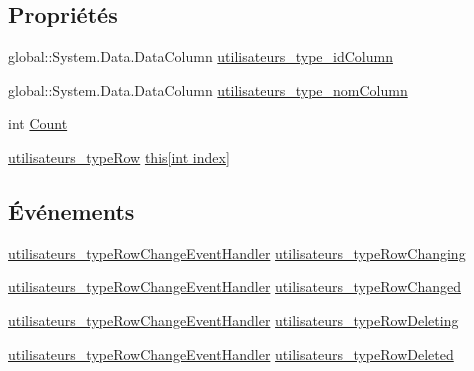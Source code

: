 \subsection*{Propriétés}
\begin{DoxyCompactItemize}
\item 
global\+::\+System.\+Data.\+Data\+Column \hyperlink{classforma_1_1formadb_data_set_1_1utilisateurs__type_data_table_a380f598143cd7d3549799af7fa6fd5eb}{utilisateurs\+\_\+type\+\_\+id\+Column}
\item 
global\+::\+System.\+Data.\+Data\+Column \hyperlink{classforma_1_1formadb_data_set_1_1utilisateurs__type_data_table_a3016a5d31607bd898c35f7227cc04d40}{utilisateurs\+\_\+type\+\_\+nom\+Column}
\item 
int \hyperlink{classforma_1_1formadb_data_set_1_1utilisateurs__type_data_table_a61fe8f0225f3e2f59c0801a73834f76d}{Count}
\item 
\hyperlink{classforma_1_1formadb_data_set_1_1utilisateurs__type_row}{utilisateurs\+\_\+type\+Row} \hyperlink{classforma_1_1formadb_data_set_1_1utilisateurs__type_data_table_a0c12b1bec621d01c9560fbcf0b794790}{this\mbox{[}int index\mbox{]}}
\end{DoxyCompactItemize}
\subsection*{Événements}
\begin{DoxyCompactItemize}
\item 
\hyperlink{classforma_1_1formadb_data_set_a2a56ecb3882d31aadc784fe0ce9c74e0}{utilisateurs\+\_\+type\+Row\+Change\+Event\+Handler} \hyperlink{classforma_1_1formadb_data_set_1_1utilisateurs__type_data_table_acc9fcbf46372af2e10ac2ec825b1db9c}{utilisateurs\+\_\+type\+Row\+Changing}
\item 
\hyperlink{classforma_1_1formadb_data_set_a2a56ecb3882d31aadc784fe0ce9c74e0}{utilisateurs\+\_\+type\+Row\+Change\+Event\+Handler} \hyperlink{classforma_1_1formadb_data_set_1_1utilisateurs__type_data_table_a5dcd447a9c2d04a57f2fedb46f3d10cb}{utilisateurs\+\_\+type\+Row\+Changed}
\item 
\hyperlink{classforma_1_1formadb_data_set_a2a56ecb3882d31aadc784fe0ce9c74e0}{utilisateurs\+\_\+type\+Row\+Change\+Event\+Handler} \hyperlink{classforma_1_1formadb_data_set_1_1utilisateurs__type_data_table_a667446ba202f25e3a4e87c74922aeb4b}{utilisateurs\+\_\+type\+Row\+Deleting}
\item 
\hyperlink{classforma_1_1formadb_data_set_a2a56ecb3882d31aadc784fe0ce9c74e0}{utilisateurs\+\_\+type\+Row\+Change\+Event\+Handler} \hyperlink{classforma_1_1formadb_data_set_1_1utilisateurs__type_data_table_ad25444087fb4ef3e6c03be4e0cc81acc}{utilisateurs\+\_\+type\+Row\+Deleted}
\end{DoxyCompactItemize}


